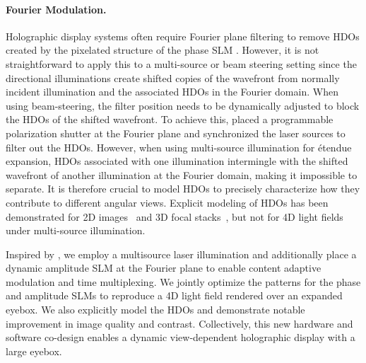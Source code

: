 \paragraph{\bf{Fourier Modulation.}} 
Holographic display systems often require Fourier plane filtering to remove HDOs created by the pixelated structure of the phase SLM \cite{maimone2017holo, peng2020neural, shi2021neural, Shi2022-ih}. However, it is not straightforward to apply this to a multi-source or beam steering setting since the directional illuminations create shifted copies of the wavefront from normally incident illumination and the associated HDOs in the Fourier domain. When using beam-steering, the filter position needs to be dynamically adjusted to block the HDOs of the shifted wavefront. To achieve this, \citet{lee2020wide} placed a programmable polarization shutter at the Fourier plane and synchronized the laser sources to filter out the HDOs. However, when using multi-source illumination for \'etendue expansion, HDOs associated with one illumination intermingle with the shifted wavefront of another illumination at the Fourier domain, making it impossible to separate. It is therefore crucial to model HDOs to precisely characterize how they contribute to different angular views. Explicit modeling of HDOs has been demonstrated for 2D images~\cite{gopakumar2021unfiltered} and 3D focal stacks~\cite{Kim2022-cd, shi2024ergo}, but not for 4D light fields under multi-source illumination.

\bigskip

Inspired by \citet{jo2022binary}, we employ a multisource laser illumination and additionally place a dynamic amplitude SLM at the Fourier plane to enable content adaptive modulation and time multiplexing. We jointly optimize the patterns for the phase and amplitude SLMs to reproduce a 4D light field rendered over an expanded eyebox. We also explicitly model the HDOs and demonstrate notable improvement in image quality and contrast. Collectively, this new hardware and software co-design enables a dynamic view-dependent holographic display with a large eyebox.



